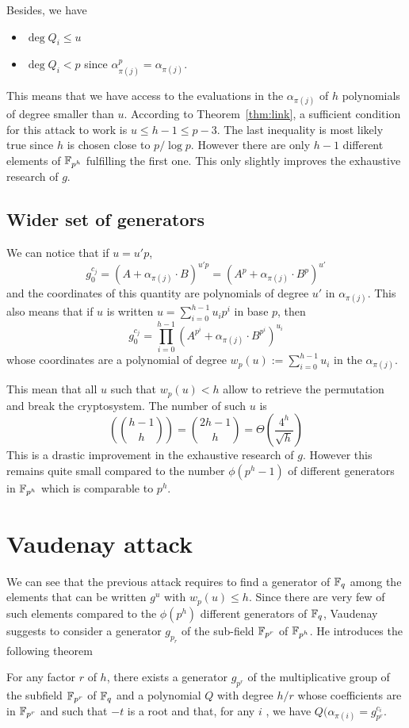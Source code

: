 \documentclass[12pt,a4paper,titlepage]{article}
\newcommand{\GF}[1]{\F_{#1}}
\begin{document}
Besides, we have
\begin{itemize}
\item $\deg Q_i \leq u$
\item $\deg Q_i < p$ since $\alpha_{\pi(j)}^p = \alpha_{\pi(j)}$.
\end{itemize}

This means that we have access to the evaluations in the $\alpha_{\pi(j)}$ of $h$ polynomials of degree smaller than $u$. According to Theorem~\ref{thm:link}, a sufficient condition for this attack to work is $u \leq h-1 \leq p-3$. The last inequality is most likely true since $h$ is chosen close to $p / \log p$. However there are only $h-1$ different elements of $\GF{p^h}$ fulfilling the first one.
This only slightly improves the exhaustive research of $g$.


\subsection{Wider set of generators}

We can notice that if $u = u'p$,
$$ g_0^{c_j} = (A + \alpha_{\pi(j)} \cdot B)^{u'p} = (A^p + \alpha_{\pi(j)} \cdot B^p)^{u'} $$
and the coordinates of this quantity are polynomials of degree $u'$ in $\alpha_{\pi(j)}$.
This also means that if $u$ is written $u = \sum_{i=0}^{h-1} u_i p^i$ in base $p$, then
$$ g_0^{c_j} = \prod_{i=0}^{h-1} (A^{p^i} + \alpha_{\pi(j)} \cdot B^{p^i} )^{u_i} $$
whose coordinates are a polynomial of degree $w_p(u) := \sum_{i=0}^{h-1} u_i$ in the $\alpha_{\pi(j)}$.

This mean that all $u$ such that $w_p(u) < h$ allow to retrieve the permutation and break the cryptosystem.
The number of such $u$ is
$$ \left( \binom{h-1}{h} \right) = \binom{2h-1}{h} =\Theta\left( \frac{4^h}{\sqrt{h}} \right) $$
This is a drastic improvement in the exhaustive research of $g$. However this remains quite small compared to the number $\phi(p^h-1)$ of different generators in $\GF{p^h}$ which is comparable to $p^h$.




\newpage
\section{Vaudenay attack}
\label{sec:Vau}

We can see that the previous attack requires to find a generator of $\mathbb{F}_q$ among the elements that can be written $g^u$ with $w_p(u) \leq h$. Since there are very few of such elements compared to the $\phi(p^h)$ different generators of $\mathbb{F}_q$, Vaudenay suggests \cite{Vau01} to consider a generator $g_{p_r}$ of the sub-field $\mathbb{F}_{p^r}$ of $\mathbb{F}_{p^h}$. He introduces the following theorem
\begin{theorem}
For any factor $r$ of $h$, there exists a generator $g_{p^r}$ of the multiplicative group of the subfield $\mathbb{F}_{p^r}$ of $\mathbb{F}_q$ and a polynomial $Q$ with degree $h/r$ whose coefficients are in $\mathbb{F}_{p^r}$ and such that $-t$ is a root and that, for any $i$ , we have $Q(\alpha_{\pi(i)} = g_{p^r}^{c_i}$.
\end{theorem}
\end{document}
